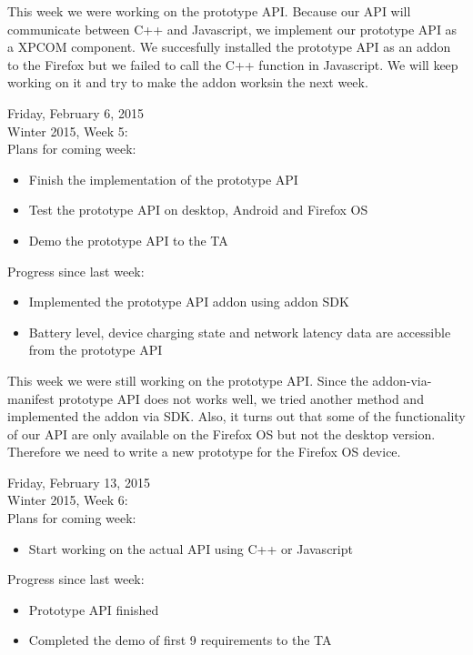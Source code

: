 This week we were working on the prototype API. ​​Because our API will communicate between C++ and Javascript, we implement our prototype API as a XPCOM component. We succesfully installed the prototype API as an addon to the Firefox but we failed to call the C++ function ​in Javascript​.​​​​ We will keep working on it and try to make the addon works​ in the next week.​

Friday, February 6, 2015 \\
​Winter 2015, Week 5: \\

Plans for coming week:
\begin{itemize}
\item Finish the implementation of the prototype API
\item Test the prototype API on desktop, Android and Firefox OS
\item Demo the prototype API to the TA
\end{itemize}

Progress since last week:​
\begin{itemize}
\item ​Implemented the prototype API addon using addon SDK​​​
​\item Battery level, device charging state and network latency data are accessible from the prototype API
​​​\end{itemize}

This week we were still working on the prototype API​. ​​Since the addon-via-manifest ​​prototype API does not works well, we tried another method and implemented the ​​addon via SDK.​​​ Also, it turns out that some of the functionality of our API are only available on the Firefox OS but not the desktop version. Therefore we need to write a new prototype for the Firefox OS device.​

Friday, February 13, 2015 \\
Winter 2015, Week 6: \\

Plans for coming week:
\begin{itemize}
\item Start working on the actual API using C++ or Javascript
\end{itemize}

Progress since last week:​
\begin{itemize}
\item Prototype API finished​​
​\item Completed the demo of first 9 requirements to the TA
​​​\end{itemize}

